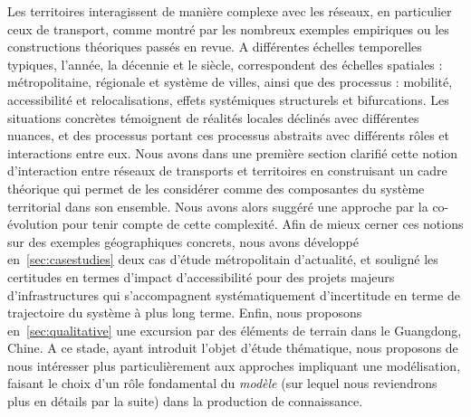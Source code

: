 Les territoires interagissent de manière complexe avec les réseaux, en particulier ceux de transport, comme montré par les nombreux exemples empiriques ou les constructions théoriques passés en revue. A différentes échelles temporelles typiques, l'année, la décennie et le siècle, correspondent des échelles spatiales : métropolitaine, régionale et système de villes, ainsi que des processus : mobilité, accessibilité et relocalisations, effets systémiques structurels et bifurcations. Les situations concrètes témoignent de réalités locales déclinés avec différentes nuances, et des processus portant ces processus abstraits avec différents rôles et interactions entre eux. Nous avons dans une première section clarifié cette notion d'interaction entre réseaux de transports et territoires en construisant un cadre théorique qui permet de les considérer comme des composantes du système territorial dans son ensemble. Nous avons alors suggéré une approche par la co-évolution pour tenir compte de cette complexité. Afin de mieux cerner ces notions sur des exemples géographiques concrets, nous avons développé en~\ref{sec:casestudies} deux cas d'étude métropolitain d'actualité, et souligné les certitudes en termes d'impact d'accessibilité pour des projets majeurs d'infrastructures qui s'accompagnent systématiquement d'incertitude en terme de trajectoire du système à plus long terme. Enfin, nous proposons en~\ref{sec:qualitative} une excursion par des éléments de terrain dans le Guangdong, Chine. A ce stade, ayant introduit l'objet d'étude thématique, nous proposons de nous intéresser plus particulièrement aux approches impliquant une modélisation, faisant le choix d'un rôle fondamental du \emph{modèle} (sur lequel nous reviendrons plus en détails par la suite) dans la production de connaissance.







\stars





